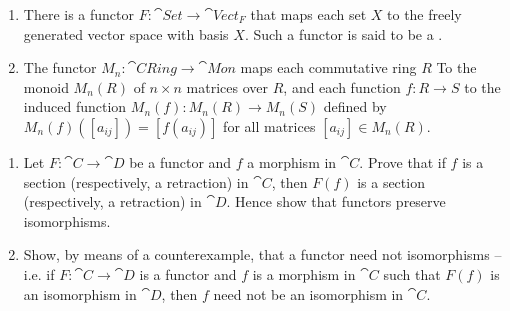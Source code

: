 \begin{Example}
\begin{enumerate}
\item There is a functor $F \colon \cat{Set} \to \cat{Vect}_F$ that maps each set $X$ to the freely generated vector space with basis $X$. Such a functor is said to be a .

\item The functor $M_n \colon \cat{CRing} \to \cat{Mon}$ maps each commutative ring $R$ To the monoid $M_n(R)$ of $n \times n$ matrices over $R$, and each function $f \colon R \to S$ to the induced function $M_n(f) \colon M_n(R) \to M_n(S)$ defined by $M_n(f)([a_{ij}]) = [f(a_{ij})]$ for all matrices $[a_{ij}] \in M_n(R)$.
\end{enumerate}
\end{Example}

\begin{Exercise}
\begin{enumerate}
\item Let $F \colon \cat C \to \cat D$ be a functor and $f$ a morphism in $\cat C$. Prove that if $f$ is a section (respectively, a retraction) in $\cat C$, then $F(f)$ is a section (respectively, a retraction) in $\cat D$. Hence show that functors preserve isomorphisms.
\item Show, by means of a counterexample, that a functor need not  isomorphisms -- i.e. if $F \colon \cat C \to \cat D$ is a functor and $f$ is a morphism in $\cat C$ such that $F(f)$ is an isomorphism in $\cat D$, then $f$ need not be an isomorphism in $\cat C$.
\end{enumerate}
\end{Exercise}


